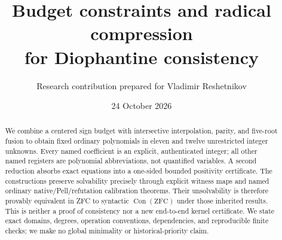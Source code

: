 \documentclass[11pt]{article}
\title{Budget constraints and radical compression\\for Diophantine consistency}
\author{Research contribution prepared for Vladimir Reshetnikov}
\date{24 October 2026}
\theoremstyle{definition}\newtheorem{definition}[theorem]{Definition}
\theoremstyle{remark}\newtheorem{remark}[theorem]{Remark}
\newcommand{\Con}{\operatorname{Con}}\newcommand{\ZFC}{\mathrm{ZFC}}
\begin{document}
\maketitle
\begin{abstract}
We combine a centered sign budget with intersective interpolation, parity,
and five-root fusion to obtain fixed ordinary polynomials in eleven and twelve unrestricted integer unknowns. Every named
coefficient is an explicit, authenticated integer; all other named registers
are polynomial abbreviations, not quantified variables. A second reduction
absorbs exact equations into a one-sided bounded positivity certificate.
The constructions preserve solvability precisely through explicit witness
maps and named ordinary native/Pell/refutation calibration theorems.
Their unsolvability is therefore provably equivalent in ZFC to syntactic
$\Con(\ZFC)$ under those inherited results. This is neither a proof of
consistency nor a new end-to-end kernel certificate. We state exact domains,
degrees, operation conventions, dependencies, and reproducible finite checks;
we make no global minimality or historical-priority claim.
\end{abstract}











\end{document}
